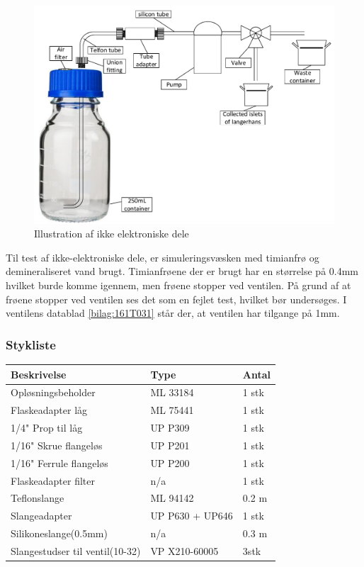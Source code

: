\begin{figure}[H]
	\centering
	\includegraphics[width=1\textwidth]{billeder/Hardware/ikkeelektronisk.pdf}
	\caption{Illustration af ikke elektroniske dele}
	\label{fig:nonelectronic}
\end{figure}

Til test af ikke-elektroniske dele, er simuleringsvæsken med timianfrø og demineraliseret vand brugt. Timianfrøene der er brugt har en størrelse på 0.4mm hvilket burde komme igennem, men frøene stopper ved ventilen. På grund af at frøene stopper ved ventilen ses det som en fejlet test, hvilket bør undersøges. I ventilens datablad \ref{bilag:161T031} står der, at ventilen har tilgange på 1mm. 

\newpage
\subsubsection{Stykliste} 
\begin{center}
		\begin{longtable}{ | m{6cm} | m{4cm}| m{2cm}| } 
			\hline
			\textbf{Beskrivelse} &\textbf{Type} & \textbf{Antal} \\ 
			\hline
			Opløsningsbeholder & ML 33184 & 1 stk \\ 
			\hline
			Flaskeadapter låg & ML 75441 & 1 stk \\ 
			\hline
			1/4" Prop til låg & UP P309 & 1 stk \\ 
			\hline
			1/16" Skrue flangeløs & UP P201 & 1 stk \\ 
			\hline
			1/16" Ferrule flangeløs & UP P200 & 1 stk \\ 
			\hline
			Flaskeadapter filter & n/a & 1 stk \\ 
			\hline	
			Teflonslange & ML 94142 & 0.2 m \\ 
			\hline
			Slangeadapter & UP P630 + UP646 & 1 stk \\ 
			\hline
			Silikoneslange(0.5mm) & n/a & 0.3 m \\ 
			\hline
			Slangestudser til ventil(10-32) & VP X210-60005 & 3stk \\ 
			\hline
		\end{longtable}
\end{center}

